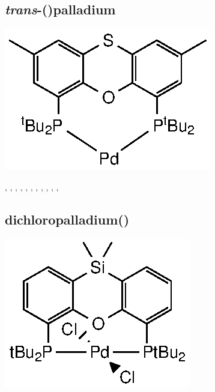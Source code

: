 \subsection*{\emph{trans}-(\tBuThixantphos)palladium}
\begin{structure}[h]
\begin{center}
\includegraphics{../Structures/StBuPd14.eps}
\end{center}
\end{structure}

,
,
,
,
,
,
,
,
,
,
,

\subsection*{dichloropalladium(\tBusixantphos)} 
\begin{structure}[h]
\begin{center}
\includegraphics{../Structures/PdCl2(Si(tBu)2)_complex.eps}
\end{center}
\end{structure}

